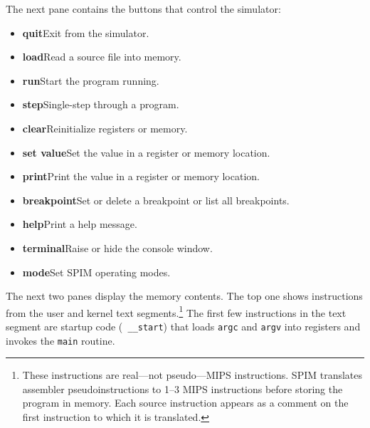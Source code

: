 The next pane contains the buttons that control the simulator:
\begin{itemize}
  \item [] {\bf quit}\newline Exit from the simulator.

  \item [] {\bf load}\newline Read a source file into memory.

  \item [] {\bf run}\newline Start the program running.

  \item [] {\bf step}\newline Single-step through a program.

  \item [] {\bf clear}\newline Reinitialize registers or memory.

  \item [] {\bf set value}\newline Set the value in a register or
memory location.

  \item [] {\bf print}\newline Print the value in a register or memory
location.

  \item [] {\bf breakpoint}\newline Set or delete a breakpoint or list
all breakpoints.

  \item [] {\bf help}\newline Print a help message.

  \item [] {\bf terminal}\newline Raise or hide the console window.

  \item [] {\bf mode}\newline Set SPIM operating modes.
\end{itemize}

The next two panes display the memory contents.  The top one shows
instructions from the user and kernel text segments.\footnote{These
instructions are real---not pseudo---MIPS instructions.  SPIM
translates assembler pseudoinstructions to 1--3 MIPS instructions
before storing the program in memory.  Each source instruction appears
as a comment on the first instruction to which it is translated.} The
first few instructions in the text segment are startup code ({\tt
\_\_start}) that loads {\tt argc} and {\tt argv} into registers and
invokes the {\tt main} routine.

